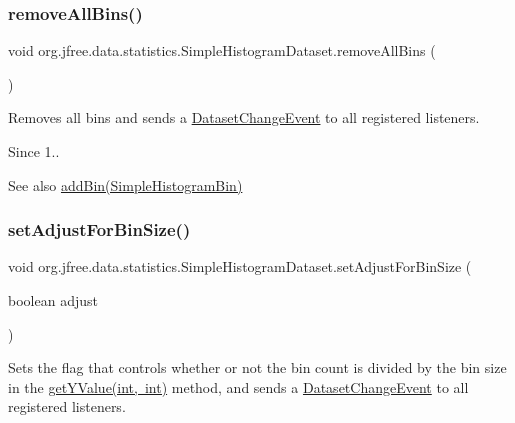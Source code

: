 \subsubsection{\texorpdfstring{remove\+All\+Bins()}{removeAllBins()}}
{\footnotesize\ttfamily void org.\+jfree.\+data.\+statistics.\+Simple\+Histogram\+Dataset.\+remove\+All\+Bins (\begin{DoxyParamCaption}{ }\end{DoxyParamCaption})}

Removes all bins and sends a \mbox{\hyperlink{}{Dataset\+Change\+Event}} to all registered listeners.

\begin{DoxySince}{Since}
1..
\end{DoxySince}
\begin{DoxySeeAlso}{See also}
\mbox{\hyperlink{classorg_1_1jfree_1_1data_1_1statistics_1_1_simple_histogram_dataset_ab06acc1a7e2ca892026bfa3f0228e407}{add\+Bin(\+Simple\+Histogram\+Bin)}} 
\end{DoxySeeAlso}
\mbox{\label{classorg_1_1jfree_1_1data_1_1statistics_1_1_simple_histogram_dataset_a8aa70f131654d3aa392cc0e90b89ed14}} 
\subsubsection{\texorpdfstring{set\+Adjust\+For\+Bin\+Size()}{setAdjustForBinSize()}}
{\footnotesize\ttfamily void org.\+jfree.\+data.\+statistics.\+Simple\+Histogram\+Dataset.\+set\+Adjust\+For\+Bin\+Size (\begin{DoxyParamCaption}\item[{boolean}]{adjust }\end{DoxyParamCaption})}

Sets the flag that controls whether or not the bin count is divided by the bin size in the \mbox{\hyperlink{classorg_1_1jfree_1_1data_1_1statistics_1_1_simple_histogram_dataset_ad84a0d6f8df0d044dfad47ddf28fc7a0}{get\+Y\+Value(int, int)}} method, and sends a \mbox{\hyperlink{}{Dataset\+Change\+Event}} to all registered listeners.


